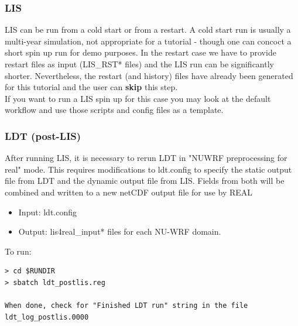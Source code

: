 \begin{frame}[fragile]\frametitle{LIS}

\footnotesize{
LIS  can be run from a cold start or from a restart. A cold start run is usually a multi-year simulation, not appropriate for a tutorial - though one can concoct a short spin up run for demo purposes. In the restart case we have to provide restart files as input (LIS\_RST* files) and the LIS run can be significantly shorter. Nevertheless,  the restart (and history) files have already been generated for this tutorial and the user can \textbf{skip} this step.
\mbox{}\\
If you want to run a LIS spin up for this case you may look at the default workflow and use those scripts and config files as a template.
}    

\end{frame}

\begin{frame}[fragile]\frametitle{LDT (post-LIS)}

\footnotesize{
After running LIS, it is necessary to rerun LDT in "NUWRF preprocessing for real" mode. This requires modifications to ldt.config to specify the static output file from LDT and the dynamic output file from LIS. Fields from both will be combined and written to a new netCDF output file for use by REAL
\begin{itemize}
\item Input: ldt.config
\item Output: lis4real\_input* files for each NU-WRF domain.
\end{itemize}
}    
\hrulefill\par
\footnotesize{To run:}
\begin{lstlisting}
> cd $RUNDIR
> sbatch ldt_postlis.reg

When done, check for "Finished LDT run" string in the file ldt_log_postlis.0000
\end{lstlisting}

\end{frame}


